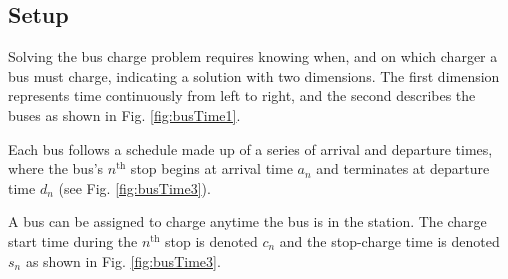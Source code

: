 \subsection{Setup}
\par Solving the bus charge problem requires knowing when, and on which charger a bus must charge, indicating a solution with two dimensions.  The first dimension represents time continuously from left to right, and the second describes the buses as shown in Fig. \ref{fig:busTime1}.

\par Each bus follows a schedule made up of a series of arrival and departure times, where the bus's $n^{\text{th}}$ stop begins at arrival time $a_n$ and terminates at departure time $d_n$ (see Fig. \ref{fig:busTime3}). 
\par A bus can be assigned to charge anytime the bus is in the station. The charge start time during the $n^{\text{th}}$ stop is denoted $c_n$ and the stop-charge time is denoted $s_n$ as shown in Fig. \ref{fig:busTime3}. 

